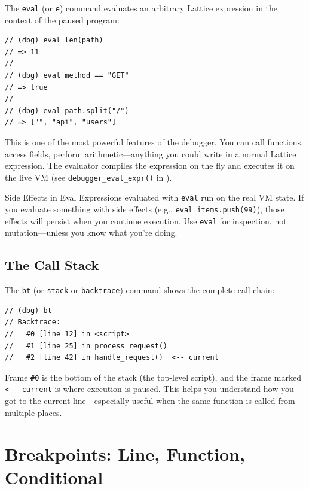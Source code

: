The \lstinline|eval| (or \lstinline|e|) command evaluates an arbitrary Lattice expression in the context of the paused program:

\begin{lstlisting}[language=Lattice, caption={Evaluating expressions in the debugger}]
// (dbg) eval len(path)
// => 11
//
// (dbg) eval method == "GET"
// => true
//
// (dbg) eval path.split("/")
// => ["", "api", "users"]
\end{lstlisting}

This is one of the most powerful features of the debugger.
You can call functions, access fields, perform arithmetic---anything you could write in a normal Lattice expression.
The evaluator compiles the expression on the fly and executes it on the live VM (see \lstinline|debugger_eval_expr()| in ).

\begin{warnbox}{Side Effects in Eval}
Expressions evaluated with \lstinline|eval| run on the real VM state.
If you evaluate something with side effects (e.g., \lstinline|eval items.push(99)|), those effects will persist when you continue execution.
Use \lstinline|eval| for inspection, not mutation---unless you know what you're doing.
\end{warnbox}

\subsection{The Call Stack}\label{sec:debug-backtrace}

The \lstinline|bt| (or \lstinline|stack| or \lstinline|backtrace|) command shows the complete call chain:

\begin{lstlisting}[language=Lattice, caption={Viewing the call stack}]
// (dbg) bt
// Backtrace:
//   #0 [line 12] in <script>
//   #1 [line 25] in process_request()
//   #2 [line 42] in handle_request()  <-- current
\end{lstlisting}

Frame \lstinline|#0| is the bottom of the stack (the top-level script), and the frame marked \lstinline|<-- current| is where execution is paused.
This helps you understand how you got to the current line---especially useful when the same function is called from multiple places.

\section{Breakpoints: Line, Function, Conditional}\label{sec:breakpoints}

